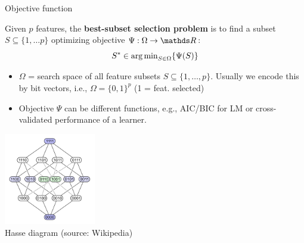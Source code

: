 \documentclass[11pt,compress,t,notes=noshow, xcolor=table]{beamer}
\begin{document}
  \begin{vbframe}{Objective function}


    Given $p$ features, the \textbf{best-subset selection problem} is to find a subset $S \subseteq \{ 1, \dots p \}$ optimizing objective $\Psi: \Omega \rightarrow \R$:
    \vspace{-0.1cm}
    $$S^{*}  \in \operatorname{arg\,min}_{{S \in \Omega}} \{ \Psi(S) \}$$
    \vspace{-0.8cm}
    \begin{itemize}
    \setlength{\itemsep}{0.9em}
     \item $\Omega$  = search space of all feature subsets $S\subseteq\{ 1, \dots, p \}$. Usually we encode this by
      bit vectors, i.e., $\Omega = \{0, 1\}^p$ (1 = feat. selected)
     \item Objective $\Psi$ can be different functions, e.g., AIC/BIC for LM or cross-validated performance of a learner.
    \end{itemize}

    \begin{center}
     \includegraphics[width = 0.3\textwidth]{figure/searchspace_binary.png}\\
     \scriptsize{Hasse diagram (source: Wikipedia)}
    \end{center}
  \end{vbframe} 
\end{document}

